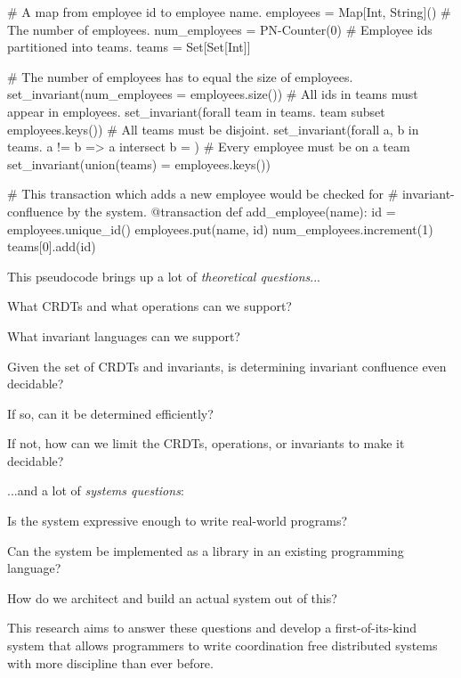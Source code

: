 \begin{Python}
# A map from employee id to employee name.
employees = Map[Int, String]()
# The number of employees.
num_employees = PN-Counter(0)
# Employee ids partitioned into teams.
teams = Set[Set[Int]]

# The number of employees has to equal the size of employees.
set_invariant(num_employees = employees.size())
# All ids in teams must appear in employees.
set_invariant(forall team in teams. team subset employees.keys())
# All teams must be disjoint.
set_invariant(forall a, b in teams. a != b => a intersect b = {})
# Every employee must be on a team
set_invariant(union(teams) = employees.keys())

# This transaction which adds a new employee would be checked for
# invariant-confluence by the system.
@transaction
def add_employee(name):
  id = employees.unique_id()
  employees.put(name, id)
  num_employees.increment(1)
  teams[0].add(id)
\end{Python}

This pseudocode brings up a lot of \emph{theoretical questions}...
\begin{inparaitem}
  \item What CRDTs and what operations can we support?
  \item What invariant languages can we support?
  \item Given the set of CRDTs and invariants, is determining invariant
    confluence even decidable?
  \item If so, can it be determined efficiently?
  \item If not, how can we limit the CRDTs, operations, or invariants to make
    it decidable?
\end{inparaitem}
...and a lot of \emph{systems questions}:
\begin{inparaitem}
  \item Is the system expressive enough to write real-world programs?
  \item Can the system be implemented as a library in an existing programming
    language?
  \item How do we architect and build an actual system out of this?
\end{inparaitem}

This research aims to answer these questions and develop a first-of-its-kind
system that allows programmers to write coordination free distributed systems
with more discipline than ever before.
